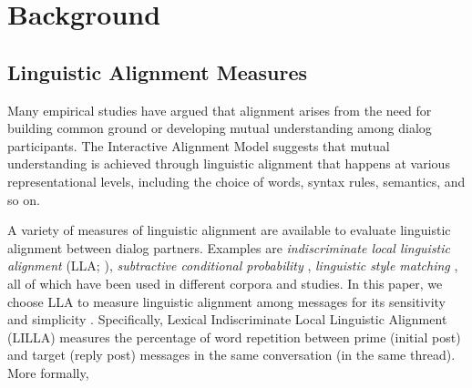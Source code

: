 \documentclass[man,biblatex,floatsintext]{apa6}
\begin{document}




\section{Background}


\subsection{Linguistic Alignment Measures}

Many empirical studies have argued that alignment arises from the need for building common ground  \parencite{clark1991grounding} or developing mutual understanding \parencite{reitter2007predicting} among dialog participants. The Interactive Alignment Model \parencite{pickering2004interactive} suggests that mutual understanding is achieved through linguistic alignment that happens at various representational levels, including the choice of words, syntax rules, semantics, and so on.

A variety of measures of linguistic alignment are available to evaluate linguistic alignment between dialog partners.  Examples are \emph{indiscriminate local linguistic alignment} (LLA; \cite{fusaroli2012coming}), \emph{subtractive conditional probability} \parencite{danescu2011mark}, \emph{linguistic style matching} \parencite{niederhoffer2002linguistic}, all of which have been used in different corpora and studies. In this paper, we choose LLA to measure linguistic alignment among messages for its sensitivity and simplicity \parencite{xu_evaluation_2015}. Specifically, Lexical Indiscriminate Local Linguistic Alignment (LILLA) measures the percentage of word repetition between prime (initial post) and target (reply post) messages in the same conversation (in the same thread). More formally,
\end{document}
